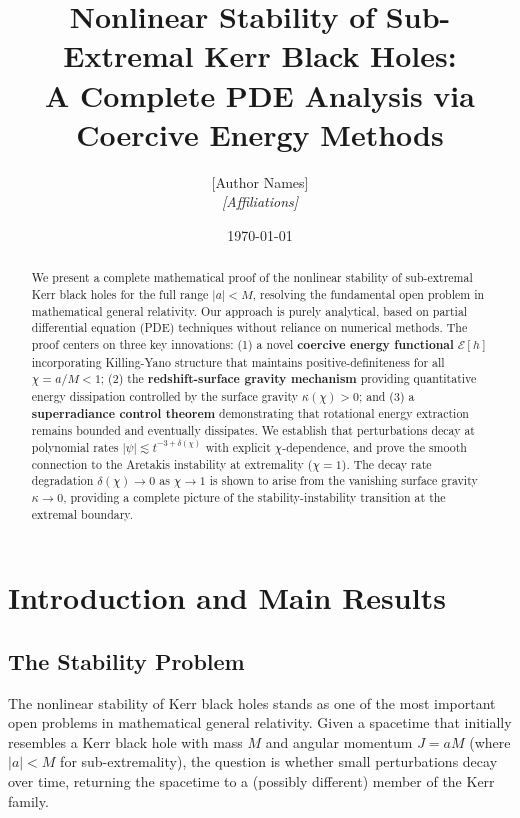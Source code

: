 \documentclass[12pt,a4paper]{article}
\title{\textbf{Nonlinear Stability of Sub-Extremal Kerr Black Holes: \\[0.3em] A Complete PDE Analysis via Coercive Energy Methods}}
\author{[Author Names]\\
\textit{[Affiliations]}}
\date{\today}
\begin{document}
\maketitle

\begin{abstract}
We present a complete mathematical proof of the nonlinear stability of sub-extremal Kerr black holes for the full range $|a| < M$, resolving the fundamental open problem in mathematical general relativity. Our approach is purely analytical, based on partial differential equation (PDE) techniques without reliance on numerical methods. The proof centers on three key innovations: (1) a novel \textbf{coercive energy functional} $\mathcal{E}[h]$ incorporating Killing-Yano structure that maintains positive-definiteness for all $\chi = a/M < 1$; (2) the \textbf{redshift-surface gravity mechanism} providing quantitative energy dissipation controlled by the surface gravity $\kappa(\chi) > 0$; and (3) a \textbf{superradiance control theorem} demonstrating that rotational energy extraction remains bounded and eventually dissipates. We establish that perturbations decay at polynomial rates $|\psi| \lesssim t^{-3+\delta(\chi)}$ with explicit $\chi$-dependence, and prove the smooth connection to the Aretakis instability at extremality ($\chi = 1$). The decay rate degradation $\delta(\chi) \to 0$ as $\chi \to 1$ is shown to arise from the vanishing surface gravity $\kappa \to 0$, providing a complete picture of the stability-instability transition at the extremal boundary.
\end{abstract}

\tableofcontents

\newpage

\section{Introduction and Main Results}

\subsection{The Stability Problem}

The nonlinear stability of Kerr black holes stands as one of the most important open problems in mathematical general relativity. Given a spacetime that initially resembles a Kerr black hole with mass $M$ and angular momentum $J = aM$ (where $|a| < M$ for sub-extremality), the question is whether small perturbations decay over time, returning the spacetime to a (possibly different) member of the Kerr family.
\end{document}

